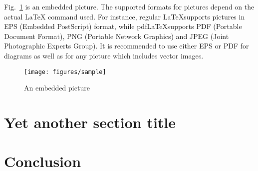 \documentclass{cseminar}
\begin{document}
Fig.~\ref{fig:mypicture1} is an embedded picture. The supported formats for pictures
depend on the actual LaTeX command used. For instance, regular \LaTeX supports
pictures in EPS (Embedded PostScript) format, while pdf\LaTeX supports PDF (Portable
Document Format), PNG (Portable Network Graphics) and JPEG (Joint Photographic Experts
Group). It is recommended to use either EPS or PDF for diagrams as well as for any picture
which includes vector images.

\begin{figure}[t]
  \begin{center}
    \texttt{[image: figures/sample]}
    \caption{An embedded picture}
    \label{fig:mypicture1}
  \end{center}
\end{figure}




\section{Yet another section title}




\section{Conclusion}





\fi

\end{document}
